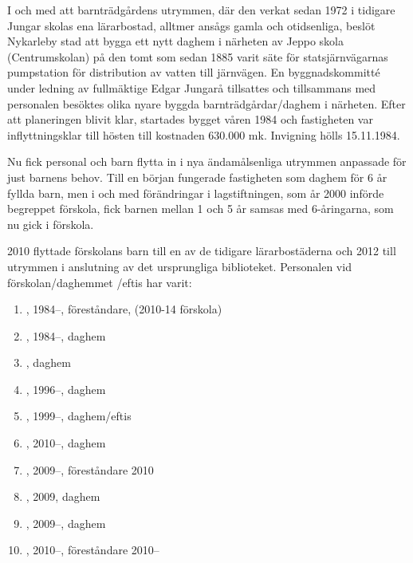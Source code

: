 
%
I och med att barnträdgårdens utrymmen, där den verkat sedan 1972 i tidigare Jungar skolas ena lärarbostad, alltmer ansågs gamla och otidsenliga, beslöt Nykarleby stad att bygga ett nytt daghem i närheten av Jeppo skola (Centrumskolan) på den tomt som sedan 1885 varit säte för statsjärnvägarnas pumpstation för distribution av vatten till järnvägen. En byggnadskommitté under ledning av fullmäktige Edgar Jungarå tillsattes och tillsammans med personalen besöktes olika nyare byggda barnträdgårdar/daghem i närheten. Efter att planeringen  blivit klar, startades bygget våren 1984 och fastigheten var inflyttningsklar till hösten till kostnaden 630.000 mk. Invigning hölls 15.11.1984.

Nu fick personal och barn flytta in i nya ändamålsenliga utrymmen anpassade för just barnens behov. Till en början fungerade fastigheten  som daghem för 6 år fyllda barn, men i och med förändringar i lagstiftningen, som år 2000 införde begreppet förskola, fick barnen mellan 1 och 5 år samsas med 6-åringarna, som nu gick i förskola.

2010 flyttade förskolans barn till en av de tidigare lärarbostäderna och 2012 till utrymmen i anslutning av det ursprungliga biblioteket. Personalen vid förskolan/daghemmet /eftis har varit:
\begin{enumerate}
  \item {}, 1984--, föreståndare, (2010-14 förskola)
  \item {}, 1984--, daghem
  \item {}, daghem
  \item {}, 1996--, daghem
  \item {}, 1999--, daghem/eftis
  \item {}, 2010--, daghem
  \item {}, 2009--, föreståndare 2010
  \item {}, 2009, daghem
  \item {}, 2009--, daghem
  \item {}, 2010--, föreståndare 2010--
\end{enumerate}



